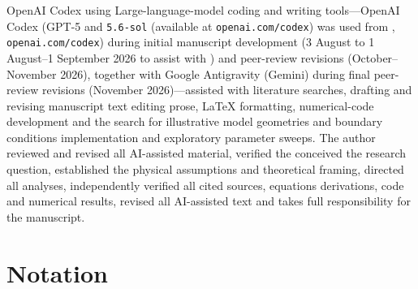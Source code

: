 \documentclass[review]{igs}
\providecommand{\DIFadd}[1]{{\protect\color{blue} \sf #1}} %
\providecommand{\DIFdel}[1]{{\protect\color{red} \scriptsize #1}} %
\providecommand{\DIFaddbegin}{} %
\providecommand{\DIFaddend}{} %
\providecommand{\DIFdelbegin}{} %
\providecommand{\DIFdelend}{} %
\newcommand{\DIFscaledelfig}{0.5}
\newlength{\DIFdelgraphicswidth} %
\newlength{\DIFdelgraphicsheight} %
\newcommand{\DIFaddincludegraphics}[2][]{{\color{blue}\fbox{\DIFOincludegraphics[#1]{#2}}}} %
\newcommand{\DIFdelincludegraphics}[2][]{%
\sbox{\DIFdelgraphicsbox}{\DIFOincludegraphics[#1]{#2}}%
\settoboxwidth{\DIFdelgraphicswidth}{\DIFdelgraphicsbox} %
\settoboxtotalheight{\DIFdelgraphicsheight}{\DIFdelgraphicsbox} %
\scalebox{\DIFscaledelfig}{%
\parbox[b]{\DIFdelgraphicswidth}{\usebox{\DIFdelgraphicsbox}\\[-\baselineskip] \rule{\DIFdelgraphicswidth}{0em}}\llap{\resizebox{\DIFdelgraphicswidth}{\DIFdelgraphicsheight}{%
\setlength{\unitlength}{\DIFdelgraphicswidth}%
\begin{picture}(1,1)%
\thicklines\linethickness{2pt} %
{\color[rgb]{1,0,0}\put(0,0){\framebox(1,1){}}}%
{\color[rgb]{1,0,0}\put(0,0){\line( 1,1){1}}}%
{\color[rgb]{1,0,0}\put(0,1){\line(1,-1){1}}}%
\end{picture}%
}\hspace*{3pt}}} %
} %
\DeclareRobustCommand{\DIFaddbegin}{\DIFOaddbegin \let\includegraphics\DIFaddincludegraphics} %
\DeclareRobustCommand{\DIFaddend}{\DIFOaddend \let\includegraphics\DIFOincludegraphics} %
\DeclareRobustCommand{\DIFdelbegin}{\DIFOdelbegin \let\includegraphics\DIFdelincludegraphics} %
\DeclareRobustCommand{\DIFdelend}{\DIFOaddend \let\includegraphics\DIFOincludegraphics} %
\begin{document}
\DIFdelbegin \DIFdel{OpenAI Codex using }\DIFdelend \DIFaddbegin \DIFadd{Large-language-model coding and writing tools---OpenAI Codex (}\DIFaddend GPT-5 and \texttt{5.6-sol}\DIFdelbegin \DIFdel{(available at \texttt{openai.com/codex}) was used from }\DIFdelend \DIFaddbegin \DIFadd{, \texttt{openai.com/codex}) during initial manuscript development (}\DIFaddend 3 \DIFdelbegin \DIFdel{August to 1 }\DIFdelend \DIFaddbegin \DIFadd{August--1 }\DIFaddend September 2026\DIFdelbegin \DIFdel{to assist with }\DIFdelend \DIFaddbegin \DIFadd{) and peer-review revisions (October--November 2026), together with Google Antigravity (Gemini) during final peer-review revisions (November 2026)---assisted with }\DIFaddend literature searches, drafting and \DIFdelbegin \DIFdel{revising manuscript text}\DIFdelend \DIFaddbegin \DIFadd{editing prose}\DIFaddend , LaTeX formatting, numerical-code \DIFdelbegin \DIFdel{development and the search for illustrative model geometries and boundary conditions}\DIFdelend \DIFaddbegin \DIFadd{implementation and exploratory parameter sweeps}\DIFaddend . The author \DIFdelbegin \DIFdel{reviewed and revised all AI-assisted material, verified the }\DIFdelend \DIFaddbegin \DIFadd{conceived the research question, established the physical assumptions and theoretical framing, directed all analyses, independently verified all }\DIFaddend cited sources, \DIFdelbegin \DIFdel{equations}\DIFdelend \DIFaddbegin \DIFadd{derivations}\DIFaddend , code and numerical results, \DIFaddbegin \DIFadd{revised all AI-assisted text }\DIFaddend and takes full responsibility for the manuscript.




\DIFaddbegin \setcounter{secnumdepth}{1}
\DIFaddend \appendix
\DIFaddbegin \makeatletter
{}
\makeatother
\DIFaddend 

\section{Notation}
\DIFaddbegin \label{app:notation}
\DIFaddend 
\end{document}
